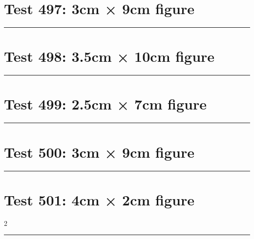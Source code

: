 \documentclass[a4paper,11pt]{article}
\begin{document}
\section*{Test 497: 3cm × 9cm figure}
\begin{swarmwrap}%
  \begin{minipage}[t]{3cm}
    \centering
    \rule{\linewidth}{9cm}
  \end{minipage}%
\end{swarmwrap}%
\swarmwrapnext
\lipsum[25]
\lipsum[26]
\lipsum[27]
\section*{Test 498: 3.5cm × 10cm figure}
\begin{swarmwrap}%
  \begin{minipage}[t]{3cm}
    \centering
    \rule{\linewidth}{10cm}
  \end{minipage}%
\end{swarmwrap}%
\swarmwrapnext
\lipsum[63]
\lipsum[64]
\lipsum[65]
\lipsum[66]
\lipsum[67]
\lipsum[68]
\section*{Test 499: 2.5cm × 7cm figure}
\begin{swarmwrap}%
  \begin{minipage}[t]{2cm}
    \centering
    \rule{\linewidth}{7cm}
  \end{minipage}%
\end{swarmwrap}%
\swarmwrapnext
\lipsum[14]
\lipsum[15]
\lipsum[16]
\section*{Test 500: 3cm × 9cm figure}
\begin{swarmwrap}%
  \begin{minipage}[t]{3cm}
    \centering
    \rule{\linewidth}{9cm}
  \end{minipage}%
\end{swarmwrap}%
\swarmwrapnext
\lipsum[75]
\lipsum[76]
\lipsum[77]
\lipsum[78]
\lipsum[79]
\lipsum[80]
\section*{Test 501: 4cm × 2cm figure}
\begin{multicols}{2}
  \begin{swarmwrap}%
    \begin{minipage}[t]{4cm}
      \centering
      \rule{\linewidth}{2cm}
    \end{minipage}%
  \end{swarmwrap}%
  \swarmwrapnext
  \lipsum[112]
  \lipsum[113]
  \lipsum[114]
\end{multicols}
\end{document}
